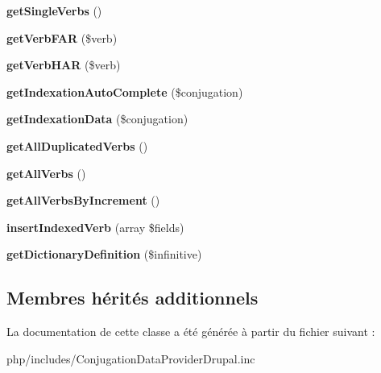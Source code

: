 \begin{DoxyCompactItemize}
{\bfseries get\+Single\+Verbs} ()
\item 
\hypertarget{classConjugationDataProviderDrupal_a892823740ce22d263f1cf8c9f8447f71}{}\label{classConjugationDataProviderDrupal_a892823740ce22d263f1cf8c9f8447f71} 
{\bfseries get\+Verb\+F\+AR} (\$verb)
\item 
\hypertarget{classConjugationDataProviderDrupal_ab60b9d6d1ed760ea68943419c176e997}{}\label{classConjugationDataProviderDrupal_ab60b9d6d1ed760ea68943419c176e997} 
{\bfseries get\+Verb\+H\+AR} (\$verb)
\item 
\hypertarget{classConjugationDataProviderDrupal_a9b0687eb6a86dfc120f72db8f622b3e2}{}\label{classConjugationDataProviderDrupal_a9b0687eb6a86dfc120f72db8f622b3e2} 
{\bfseries get\+Indexation\+Auto\+Complete} (\$conjugation)
\item 
\hypertarget{classConjugationDataProviderDrupal_a3cd6ea1c1628a03e31095b3c5589e9b7}{}\label{classConjugationDataProviderDrupal_a3cd6ea1c1628a03e31095b3c5589e9b7} 
{\bfseries get\+Indexation\+Data} (\$conjugation)
\item 
\hypertarget{classConjugationDataProviderDrupal_a4a933054f17ac39bc1f8511d46f458a0}{}\label{classConjugationDataProviderDrupal_a4a933054f17ac39bc1f8511d46f458a0} 
{\bfseries get\+All\+Duplicated\+Verbs} ()
\item 
\hypertarget{classConjugationDataProviderDrupal_a6f5059d90f7186ec52a2755376f2734c}{}\label{classConjugationDataProviderDrupal_a6f5059d90f7186ec52a2755376f2734c} 
{\bfseries get\+All\+Verbs} ()
\item 
\hypertarget{classConjugationDataProviderDrupal_a28b01db0d2e9a1c72f6eaadaba71de33}{}\label{classConjugationDataProviderDrupal_a28b01db0d2e9a1c72f6eaadaba71de33} 
{\bfseries get\+All\+Verbs\+By\+Increment} ()
\item 
\hypertarget{classConjugationDataProviderDrupal_a3a8340c3d8abaa7e28f2f84c8c00a307}{}\label{classConjugationDataProviderDrupal_a3a8340c3d8abaa7e28f2f84c8c00a307} 
{\bfseries insert\+Indexed\+Verb} (array \$fields)
\item 
\hypertarget{classConjugationDataProviderDrupal_ab22abe0370abb175544efd352f96a468}{}\label{classConjugationDataProviderDrupal_ab22abe0370abb175544efd352f96a468} 
{\bfseries get\+Dictionary\+Definition} (\$infinitive)
\end{DoxyCompactItemize}
\subsection*{Membres hérités additionnels}


La documentation de cette classe a été générée à partir du fichier suivant \+:\begin{DoxyCompactItemize}
\item 
php/includes/Conjugation\+Data\+Provider\+Drupal.\+inc\end{DoxyCompactItemize}
